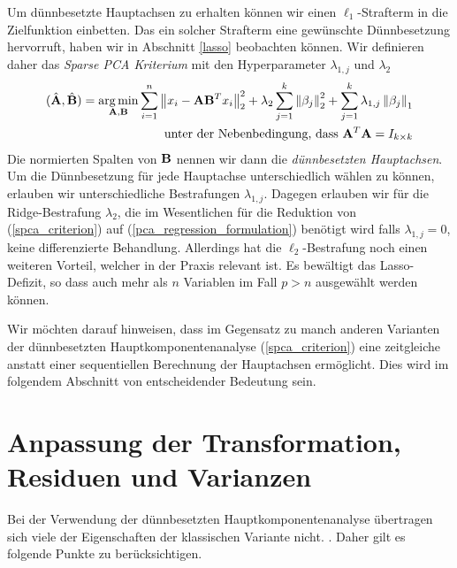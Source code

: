 Um dünnbesetzte Hauptachsen zu erhalten können wir einen $\ell_1$-Strafterm in die Zielfunktion einbetten. Das ein solcher Strafterm eine gewünschte Dünnbesetzung hervorruft, haben wir in Abschnitt \ref{lasso} beobachten können. Wir definieren daher das \textit{Sparse PCA Kriterium} mit den Hyperparameter $\lambda_{1,j}$ und $\lambda_2$
\begin{align}
\label{spca_criterion}
\begin{split}
(\hat{\mathbf{A}}, \hat{\mathbf{B}}) = \operatorname*{arg\,min}_{\mathbf{A}, \mathbf{B}} \sum_{i=1}^{n} \left\lVert x_i - \mathbf{A}\mathbf{B}^Tx_i \right\rVert_2^2 + \lambda_2 \sum_{j=1}^{k}\left\lVert \beta_j \right\rVert_2^2 + \sum_{j=1}^k \lambda_{1,j} \left\lVert \beta_j \right\rVert_1\\
\text{unter der Nebenbedingung, dass } \mathbf{A}^T\mathbf{A} = I_{k \times k}
\end{split}
\end{align}
Die normierten Spalten von $\mathbf{B}$ nennen wir dann die \textit{dünnbesetzten Hauptachsen}. Um die Dünnbesetzung für jede Hauptachse unterschiedlich wählen zu können, erlauben wir unterschiedliche Bestrafungen $\lambda_{1,j}$. Dagegen erlauben wir für die Ridge-Bestrafung $\lambda_2$, die im Wesentlichen für die Reduktion von (\ref{spca_criterion}) auf (\ref{pca_regression_formulation}) benötigt wird falls $\lambda_{1,j} = 0$, keine differenzierte Behandlung. Allerdings hat die $\ell_2$-Bestrafung noch einen weiteren Vorteil, welcher in der Praxis relevant ist. Es bewältigt das Lasso-Defizit, so dass auch mehr als $n$ Variablen im Fall $p>n$ ausgewählt werden können.

Wir möchten darauf hinweisen, dass im Gegensatz zu manch anderen Varianten der dünnbesetzten Hauptkomponentenanalyse (\ref{spca_criterion}) eine zeitgleiche anstatt einer sequentiellen Berechnung der Hauptachsen ermöglicht. Dies wird im folgendem Abschnitt von entscheidender Bedeutung sein.





\section{Anpassung der Transformation, Residuen und Varianzen}
\label{adjustment_of_variances}

Bei der Verwendung der dünnbesetzten Hauptkomponentenanalyse übertragen sich viele der Eigenschaften der klassischen Variante nicht. \cite{camacho}. Daher gilt es folgende Punkte zu berücksichtigen.\\

